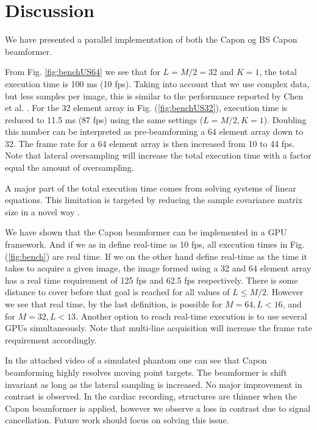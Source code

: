 \documentclass[12pt,journal,onecolumn]{IEEEtran}
\begin{document}
\section{Discussion}\label{sec:dis}
We have presented a parallel implementation of both the Capon og BS Capon beamformer. 

From Fig. \ref{fig:benchUS64} we see that for $L = M/2 = 32$ and $K=1$, the total execution time is 100 ms (10 fps). Taking into account that we use complex data, but less samples per image, this is similar to the performance reported by Chen et al. \cite{Chen2011}. For the 32 element array in Fig. (\ref{fig:benchUS32}), execution time is reduced to 11.5 ms (87 fps) using the same settings ($L=M/2, K = 1$). Doubling this number can be interpreted as pre-beamforming a 64 element array down to 32. The frame rate for a 64 element array is then increased from 10 to 44 fps. Note that lateral oversampling will increase the total execution time with a factor equal the amount of oversampling.  

A major part of the total execution time comes from solving systems of linear equations. This limitation is targeted by reducing the sample covariance matrix size in a novel way \cite{Nilsen2009}. 

We have shown that the Capon beamformer can be implemented in a GPU framework. And if we as in \cite{Chen2011} define real-time as 10 fps, all execution times  in Fig. (\ref{fig:bench}) are real time. If we on the other hand define real-time as the time it takes to acquire a given image, the image formed using a 32 and 64 element array has a real time requirement of 125 fps and 62.5 fps respectively. There is some distance to cover before that goal is reached for all values of $L \le M/2$. However we see that real time, by the last definition, is possible for $M=64, L < 16$, and for $M = 32, L < 13$. Another option to reach real-time execution is to use several GPUs simultaneously. Note that multi-line acquisition will increase the frame rate requirement accordingly.
 
In the attached video of a simulated phantom one can see that Capon beamforming highly resolves moving point targets. The beamformer is shift invariant as long as the lateral sampling is increased. No major improvement in contrast is observed. In the cardiac recording, structures are thinner when the Capon beamformer is applied, however we observe a loss in contrast due to signal cancellation. Future work should focus on solving this issue.
\end{document}
